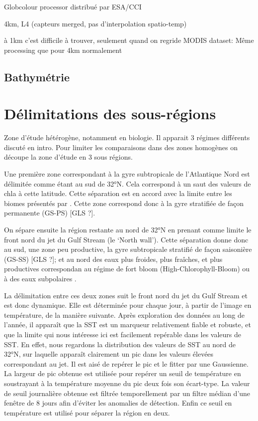 \documentclass[index]{subfiles}
\begin{document}
Globcolour processor
distribué par ESA/CCI

4km, L4 (capteurs merged, pas d'interpolation spatio-temp)

à 1km c'est difficile à trouver, seulement quand on regride MODIS
dataset: \parencite{chl_modis}
Même processing que pour 4km normalement


\subsection{Bathymétrie}
\label{sec:donnees-bathymetrie}


\section{Délimitations des sous-régions}
\label{sec:delimitations-regions}

Zone d'étude hétérogène, notamment en biologie.
Il apparait 3 régimes différents discuté en intro.
Pour limiter les comparaisons dans des zones homogènes on découpe la zone d'étude en 3 sous régions.

Une première zone correspondant à la gyre subtropicale de l'Atlantique Nord est délimitée comme étant au sud de 32°N.
Cela correspond à un saut des valeurs de \gls{chla} à cette latitude.
Cette séparation est en accord avec la limite entre les biomes présentés par \cite{sarmiento_2004}.
Cette zone correspond donc à la gyre stratifiée de façon permanente (GS-PS) [GLS ?].

On sépare ensuite la région restante au nord de 32°N en prenant comme limite le front nord du jet du Gulf Stream (le `North wall'). Cette séparation donne donc au sud, une zone peu productive, la gyre subtropicale stratifié de façon saisonière (GS-SS) [GLS ?]; et au nord des eaux plus froides, plus fraîches, et plus productives correspondan au régime de fort bloom (High-Chlorophyll-Bloom)  ou à des eaux subpolaires .

La délimitation entre ces deux zones suit le front nord du jet du Gulf Stream et est donc dynamique. Elle est déterminée pour chaque jour, à partir de l'image en température, de la manière suivante.
Après exploration des données au long de l'année, il apparaît que la SST est un marqueur relativement fiable et robuste, et que la limite qui nous intéresse ici est facilement repérable dans les valeurs de SST.
En effet, nous regardons la distribution des valeurs de SST au nord de 32°N, sur laquelle apparaît clairement un pic dans les valeurs élevées correspondant au jet.
Il est aisé de repérer le pic et le fitter par une Gaussienne. La largeur de pic obtenue est utilisée pour repérer un seuil de température en soustrayant à la température moyenne du pic deux fois son écart-type.
La valeur de seuil journalière obtenue est filtrée temporellement par un filtre médian d'une fenêtre de 8 jours afin d'éviter les anomalies de détection.
Enfin ce seuil en température est utilisé pour séparer la région en deux.
\end{document}
